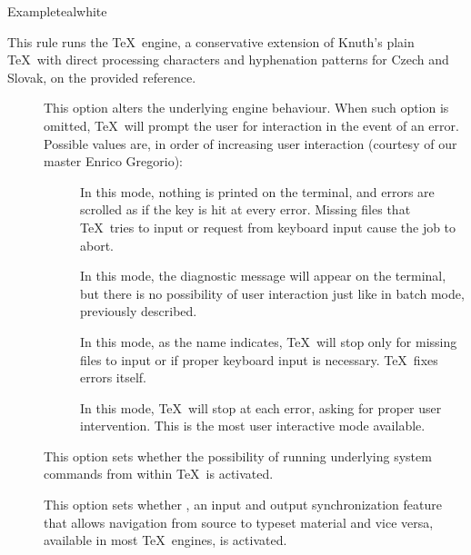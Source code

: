 \begin{description}
\begin{codebox}{Example}{teal}{\icnote}{white}
\end{codebox}

\item[\rulebox{csplain}]
This rule runs the  \TeX\ engine, a conservative extension of Knuth's plain \TeX\ with direct processing characters and hyphenation patterns for Czech and Slovak, on the provided  reference.

\begin{description}
\item[] This option alters the underlying engine behaviour. When such option is omitted, \TeX\ will prompt the user for interaction in the event of an error. Possible values are, in order of increasing user interaction (courtesy of our master Enrico Gregorio):

\begin{description}
\item[] In this mode, nothing is printed on the terminal, and errors are scrolled as if the  key is hit at every error. Missing files that \TeX\ tries to input or request from keyboard input cause the job to abort.

\item[] In this mode, the diagnostic message will appear on the terminal, but there is no possibility of user interaction just like in batch mode, previously described.

\item[] In this mode, as the name indicates, \TeX\ will stop only for missing files to input or if proper keyboard input is necessary. \TeX\ fixes errors itself.

\item[] In this mode, \TeX\ will stop at each error, asking for proper user intervention. This is the most user interactive mode available.
\end{description}

\item[] This option sets whether the possibility of running underlying system commands from within \TeX\ is activated.

\item[] This option sets whether , an input and output synchronization feature that allows navigation from source to typeset material and vice versa, available in most \TeX\ engines, is activated.


\end{description}
\end{description}
